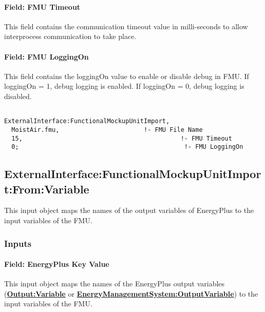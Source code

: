 \paragraph{Field: FMU Timeout}\label{field-fmu-timeout}

This field contains the communication timeout value in milli-seconds to allow interprocess communication to take place.

\paragraph{Field: FMU LoggingOn}\label{field-fmu-loggingon}

This field contains the loggingOn value to enable or disable debug in FMU. If loggingOn = 1, debug logging is enabled. If loggingOn = 0, debug logging is disabled.

\begin{lstlisting}

ExternalInterface:FunctionalMockupUnitImport,
  MoistAir.fmu,                       !- FMU File Name
  15,                                           !- FMU Timeout
  0;                                             !- FMU LoggingOn
\end{lstlisting}

\subsection{ExternalInterface:FunctionalMockupUnitImport:From:Variable}\label{externalinterfacefunctionalmockupunitimportfromvariable}

This input object maps the names of the output variables of EnergyPlus to the input variables of the FMU.

\subsubsection{Inputs}\label{inputs-5-010}

\paragraph{Field: EnergyPlus Key Value}\label{field-energyplus-key-value}

This input object maps the names of the EnergyPlus output variables (\textbf{\hyperref[outputvariable]{Output:Variable}} or \textbf{\hyperref[energymanagementsystemoutputvariable]{EnergyManagementSystem:OutputVariable}}) to the input variables of the FMU.

